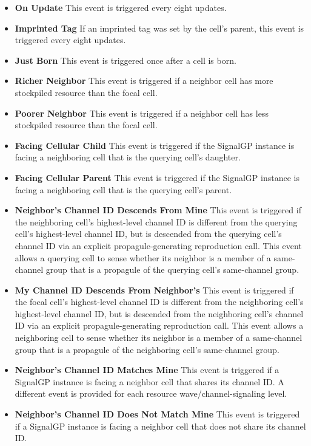 \begin{itemize}
\item \textbf{On Update}
This event is triggered every eight updates.
\item \textbf{Imprinted Tag}
If an imprinted tag was set by the cell's parent, this event is triggered every eight updates.
\item \textbf{Just Born}
This event is triggered once after a cell is born.
\item \textbf{Richer Neighbor}
This event is triggered if a neighbor cell has more stockpiled resource than the focal cell.
\item \textbf{Poorer Neighbor}
This event is triggered if a neighbor cell has less stockpiled resource than the focal cell.
\item \textbf{Facing Cellular Child}
This event is triggered if the SignalGP instance is facing a neighboring cell that is the querying cell's daughter.
\item \textbf{Facing Cellular Parent}
This event is triggered if the SignalGP instance is facing a neighboring cell that is the querying cell's parent.
\item \textbf{Neighbor's Channel ID Descends From Mine}
This event is triggered if the neighboring cell's highest-level channel ID is different from the querying cell's highest-level channel ID, but is descended from the querying cell's channel ID via an explicit propagule-generating reproduction call.
This event allows a querying cell to sense whether its neighbor is a member of a same-channel group that is a propagule of the querying cell's same-channel group.
\item \textbf{My Channel ID Descends From Neighbor's}
This event is triggered if the focal cell's highest-level channel ID is different from the neighboring cell's highest-level channel ID, but is descended from the neighboring cell's channel ID via an explicit propagule-generating reproduction call.
This event allows a neighboring cell to sense whether its neighbor is a member of a same-channel group that is a propagule of the neighboring cell's same-channel group.
\item \textbf{Neighbor's Channel ID Matches Mine}
This event is triggered if a SignalGP instance is facing a neighbor cell that shares its channel ID.
A different event is provided for each resource wave/channel-signaling level.
\item \textbf{Neighbor's Channel ID Does Not Match Mine}
This event is triggered if a SignalGP instance is facing a neighbor cell that does not share its channel ID.

\end{itemize}

